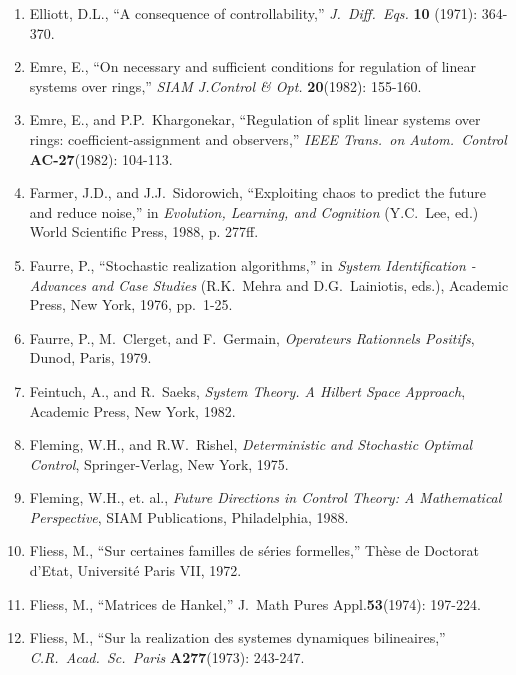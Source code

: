 \begin{enumerate}
\item
Elliott, D.L., ``A consequence of controllability,'' {\it J.\ Diff.\ Eqs.}
{\bf 10} (1971): 364-370.

\item
Emre, E., ``On necessary and sufficient conditions for regulation of linear
systems over rings,'' {\it SIAM J.Control \& Opt.} {\bf 20}(1982): 155-160.

\item
Emre, E., and P.P.\ Khargonekar, ``Regulation of split linear systems over
rings: coefficient-assignment and observers,'' {\it IEEE Trans.\ on Autom.\
Control} {\bf AC-27}(1982): 104-113.

\item
Farmer, J.D., and J.J.\ Sidorowich, ``Exploiting chaos to predict the future
and reduce noise,'' in {\it Evolution, Learning, and Cognition} (Y.C.\ Lee,
ed.)  World Scientific Press, 1988, p. 277ff.

\item
Faurre, P., ``Stochastic realization algorithms,'' in {\it System
Identification - Advances and Case Studies} (R.K.\ Mehra and D.G.\ Lainiotis,
eds.), Academic Press, New York, 1976, pp.\ 1-25.

\item
Faurre, P., M.\ Clerget, and F.\ Germain, {\it Operateurs Rationnels
Positifs}, Dunod, Paris, 1979.

\item
Feintuch, A., and R.\ Saeks, {\it System Theory.  A Hilbert Space Approach},
Academic Press, New York, 1982.

\item
Fleming, W.H., and R.W.\ Rishel, {\it Deterministic and Stochastic Optimal
Control}, Springer-Verlag, New York, 1975.

\item
Fleming, W.H., et. al., {\it Future Directions in Control Theory: A
Mathematical Perspective}, SIAM Publications, Philadelphia, 1988.

\item
Fliess, M., ``Sur certaines familles de s\'eries formelles,'' Th\`ese de
Doctorat d'Etat, Universit\'e Paris VII, 1972.

\item
Fliess, M., ``Matrices de Hankel,'' J.\ Math Pures Appl.{\bf 53}(1974):
197-224.

\item
Fliess, M., ``Sur la realization des systemes dynamiques bilineaires,'' {\it
C.R.\ Acad.\ Sc.\ Paris} {\bf A277}(1973): 243-247.


\end{enumerate}
